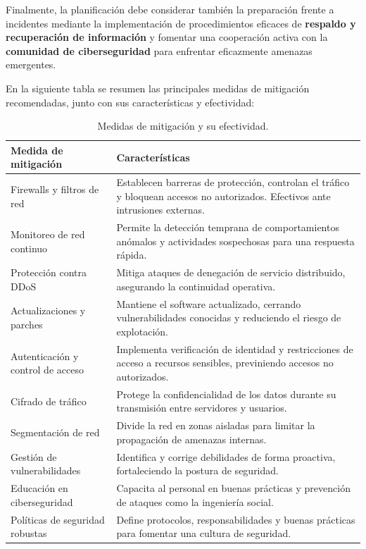 \documentclass[a4paper, 11pt]{article}
\begin{document}
Finalmente, la planificación debe considerar también la preparación frente a incidentes mediante la implementación de procedimientos eficaces de \textbf{respaldo y recuperación de información} y fomentar una cooperación activa con la \textbf{comunidad de ciberseguridad} para enfrentar eficazmente amenazas emergentes.

En la siguiente tabla se resumen las principales medidas de mitigación recomendadas, junto con sus características y efectividad:

\begin{table}[H]
    \centering
    \caption{Medidas de mitigación y su efectividad.}
    \begin{tabular}{p{4.5cm} p{10cm}}
    \toprule
    \textbf{Medida de mitigación} & \textbf{Características} \\
    \hline
    Firewalls y filtros de red & Establecen barreras de protección, controlan el tráfico y bloquean accesos no autorizados. Efectivos ante intrusiones externas. \\
    \bottomrule
    Monitoreo de red continuo & Permite la detección temprana de comportamientos anómalos y actividades sospechosas para una respuesta rápida. \\
    \bottomrule
    Protección contra DDoS & Mitiga ataques de denegación de servicio distribuido, asegurando la continuidad operativa. \\
    \bottomrule
    Actualizaciones y parches & Mantiene el software actualizado, cerrando vulnerabilidades conocidas y reduciendo el riesgo de explotación. \\
    \bottomrule
    Autenticación y control de acceso & Implementa verificación de identidad y restricciones de acceso a recursos sensibles, previniendo accesos no autorizados. \\
    \bottomrule
    Cifrado de tráfico & Protege la confidencialidad de los datos durante su transmisión entre servidores y usuarios. \\
    \bottomrule
    Segmentación de red & Divide la red en zonas aisladas para limitar la propagación de amenazas internas. \\
    \bottomrule
    Gestión de vulnerabilidades & Identifica y corrige debilidades de forma proactiva, fortaleciendo la postura de seguridad. \\
    \bottomrule
    Educación en ciberseguridad & Capacita al personal en buenas prácticas y prevención de ataques como la ingeniería social. \\
    \bottomrule
    Políticas de seguridad robustas & Define protocolos, responsabilidades y buenas prácticas para fomentar una cultura de seguridad. \\

\end{tabular}
\end{table}
\end{document}
